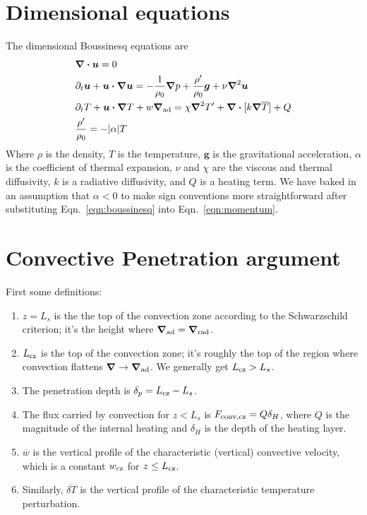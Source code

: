 \documentclass[12pt,preprint]{article}
\renewcommand{\vec}[1]{\boldsymbol{#1}}
\renewcommand{\dot}{\vec{\cdot}}
\newcommand{\grad}{\vec{\nabla}}
\begin{document}
\section{Dimensional equations}
The dimensional Boussinesq equations are
\begin{align}
&\grad\dot\vec{u} = 0 \label{eqn:continuity} \\
&\partial_t \vec{u} + \vec{u}\dot\grad\vec{u} = -\frac{1}{\rho_0}\grad p + \frac{\rho'}{\rho_0}\vec{g} + \nu\grad^2 \vec{u} \label{eqn:momentum} \\
&\partial_t T + \vec{u}\dot\grad T + w \grad_{\rm{ad}} = \chi\grad^2 T' + \grad\dot[k \grad \overline{T}] + Q \label{eqn:temperature} \\
&\frac{\rho'}{\rho_0} = -|\alpha| T \label{eqn:boussinesq}
\end{align}
Where $\rho$ is the density, $T$ is the temperature, $\vec{g}$ is the gravitational acceleration, $\alpha$ is the coefficient of thermal expansion, $\nu$ and $\chi$ are the viscous and thermal diffusivity, $k$ is a radiative diffusivity, and $Q$ is a heating term.
We have baked in an assumption that $\alpha < 0$ to make sign conventions more straightforward after substituting Eqn.~\ref{eqn:boussinesq} into Eqn.~\ref{eqn:momentum}.

\section{Convective Penetration argument}
First some definitions:
\begin{enumerate}
\item $z=L_s$ is the the top of the convection zone according to the Schwarzschild criterion; it's the height where $\grad_{\rm{ad}} = \grad_{\rm{rad}}$.
\item $L_{\rm{cz}}$ is the top of the convection zone; it's roughly the top of the region where convection flattens $\grad \rightarrow \grad_{\rm{ad}}$.
We generally get $L_{\rm{cz}} > L_s$.
\item The penetration depth is $\delta_p = L_{\rm{cz}} - L_s$.
\item The flux carried by convection for $z < L_s$ is $F_{\rm{conv,cz}} = Q \delta_H$, where $Q$ is the magnitude of the internal heating and $\delta_H$ is the depth of the heating layer.
\item $\overline{w}$ is the vertical profile of the characteristic (vertical) convective velocity, which is a constant $w_{\rm{cz}}$ for $z \leq L_{\rm{cz}}$.
\item Similarly, $\overline{\delta T}$ is the vertical profile of the characteristic temperature perturbation.
\end{enumerate}
\end{document}
